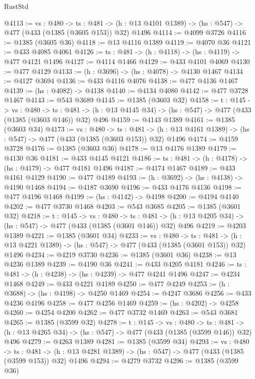 \begin{lexlean}{RustStd}
\begin{coremodule}
{\begin{coremodule}
{{{{{{{{{{{{{{{{@4113 := {vs : @480} ->
  {ts : @481} -> (h : @13 @4101 @1389) -> (hs : @547) -> @477 (@433 (@1385 (@3605 @153)) @32) @1496
@4114 := @4099 @3726
@4116 := @1385 (@3605 @36)
@4118 := @13 @4116 @1389
@4119 := @4070 @36
@4121 := @433 @4085 @4061
@4126 := {ts : @481} -> (h : @4118) -> (hs : @4119) -> @477 @4121 @1496
@4127 := @4114 @1466
@4129 := @433 @4101 @4069
@4130 := @477 @4129
@4133 := (h : @3696) -> (hs : @4078) -> @4130 @1467
@4134 := @4127 @3694
@4136 := @433 @4116 @4076
@4138 := @477 @4136 @1467
@4139 := (hs : @4082) -> @4138
@4140 := @4134 @4080
@4142 := @477 @3728 @1467
@4143 := @543 @3689
@4145 := @1385 (@3603 @32)
@4158 := {t : @145} ->
  {vs : @480} ->
  {ts : @481} -> (h : @13 @4145 @34) -> (hs : @547) -> @477 (@433 (@1385 (@3603 @146)) @32) @496
@4159 := @4143 @1389
@4161 := @1385 (@3603 @34)
@4173 := {vs : @480} ->
  {ts : @481} -> (h : @13 @4161 @1389) -> (hs : @547) -> @477 (@433 (@1385 (@3603 @153)) @32) @1496
@4174 := @4159 @3728
@4176 := @1385 (@3603 @36)
@4178 := @13 @4176 @1389
@4179 := @4130 @36
@4181 := @433 @4145 @4121
@4186 := {ts : @481} -> (h : @4178) -> (hs : @4179) -> @477 @4181 @1496
@4187 := @4174 @1467
@4189 := @433 @4161 @4129
@4190 := @477 @4189
@4193 := (h : @3692) -> (hs : @4138) -> @4190 @1468
@4194 := @4187 @3690
@4196 := @433 @4176 @4136
@4198 := @477 @4196 @1468
@4199 := (hs : @4142) -> @4198
@4200 := @4194 @4140
@4202 := @477 @3730 @1468
@4203 := @543 @3685
@4205 := @1385 (@3601 @32)
@4218 := {t : @145} ->
  {vs : @480} ->
  {ts : @481} -> (h : @13 @4205 @34) -> (hs : @547) -> @477 (@433 (@1385 (@3601 @146)) @32) @496
@4219 := @4203 @1389
@4221 := @1385 (@3601 @34)
@4233 := {vs : @480} ->
  {ts : @481} -> (h : @13 @4221 @1389) -> (hs : @547) -> @477 (@433 (@1385 (@3601 @153)) @32) @1496
@4234 := @4219 @3730
@4236 := @1385 (@3601 @36)
@4238 := @13 @4236 @1389
@4239 := @4190 @36
@4241 := @433 @4205 @4181
@4246 := {ts : @481} -> (h : @4238) -> (hs : @4239) -> @477 @4241 @1496
@4247 := @4234 @1468
@4249 := @433 @4221 @4189
@4250 := @477 @4249
@4253 := (h : @3688) -> (hs : @4198) -> @4250 @1469
@4254 := @4247 @3686
@4256 := @433 @4236 @4196
@4258 := @477 @4256 @1469
@4259 := (hs : @4202) -> @4258
@4260 := @4254 @4200
@4262 := @477 @3732 @1469
@4263 := @543 @3681
@4265 := @1385 (@3599 @32)
@4278 := {t : @145} ->
  {vs : @480} ->
  {ts : @481} -> (h : @13 @4265 @34) -> (hs : @547) -> @477 (@433 (@1385 (@3599 @146)) @32) @496
@4279 := @4263 @1389
@4281 := @1385 (@3599 @34)
@4293 := {vs : @480} ->
  {ts : @481} -> (h : @13 @4281 @1389) -> (hs : @547) -> @477 (@433 (@1385 (@3599 @153)) @32) @1496
@4294 := @4279 @3732
@4296 := @1385 (@3599 @36)
}}}}}}}}}}}}}}}}
\end{coremodule}}
\end{coremodule}
\end{lexlean}
